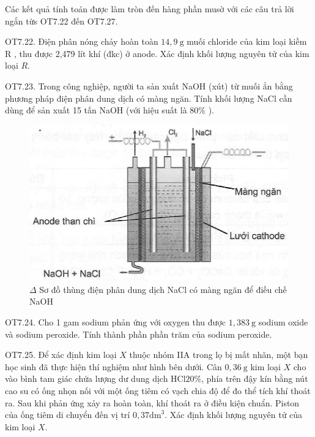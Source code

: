 \documentclass[10pt]{article}
\begin{document}
Các kết quả tính toán được làm tròn đến hàng phần musờ với các câu trả lời ngắn từs OT7.22 đến OT7.27.

OT7.22. Điện phân nóng chảy hoàn toàn $14,9 \mathrm{~g}$ muối chloride của kim loại kiềm R , thu được 2,479 lít khí (đkc) ở anode. Xác định khối lượng nguyên tử của kim loại $R$.

OT7.23. Trong công nghiệp, người ta sản xuất NaOH (xút) từ muối ẳn bằng phương pháp điện phân dung dịch có màng ngăn. Tính khối lượng NaCl cần dùng để sản xuất 15 tấn NaOH (với hiệu suất là $80 \%$ ).

\begin{figure}[h]
\begin{center}
  \includegraphics[width=\textwidth]{2025_10_23_de6f5713836e4e91b3c8g-120}
\captionsetup{labelformat=empty}
\caption{$\Delta$ Sơ đồ thùng điện phân dung dịch NaCl có màng ngăn để điều chế NaOH}
\end{center}
\end{figure}

OT7.24. Cho 1 gam sodium phản ứng với oxygen thu được $1,383 \mathrm{~g}$ sodium oxide và sodium peroxide. Tính thành phần phần trăm của sodium peroxide.

OT7.25. Để xác định kim loại $X$ thuộc nhóm IIA trong lọ bị mất nhãn, một bạn học sinh đã thực hiện thí nghiệm như hình bên dưới. Cân $0,36 \mathrm{~g}$ kim loại $X$ cho vào bình tam giác chứa lượng dư dung dịch $\mathrm{HCl} 20 \%$, phía trên đậy kín bằng nút cao su có ống nhọn nối với một ống tiêm có vạch chia độ để đo thể tích khí thoát ra. Sau khi phản ứng xảy ra hoàn toàn, khí thoát ra ở điều kiện chuẩn. Piston của ống tiêm di chuyển đến vị trí $0,37 \mathrm{dm}^{3}$. Xác định khối lượng nguyên tử của kim loại $X$.
\end{document}
